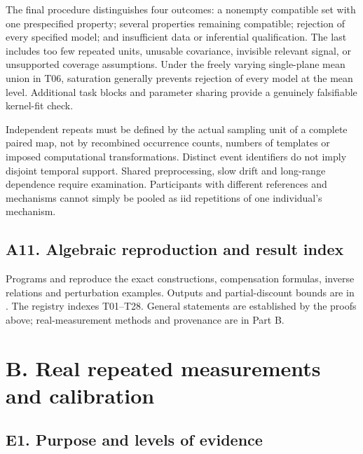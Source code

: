 \documentclass[11pt,a4paper]{article}
\begin{document}
\endgroup

The final procedure distinguishes four outcomes: a nonempty compatible
set with one prespecified property; several properties remaining
compatible; rejection of every specified model; and insufficient data or
inferential qualification. The last includes too few repeated units,
unusable covariance, invisible relevant signal, or unsupported coverage
assumptions. Under the freely varying single-plane mean union in T06,
saturation generally prevents rejection of every model at the mean
level. Additional task blocks and parameter sharing provide a genuinely
falsifiable kernel-fit check.

Independent repeats must be defined by the actual sampling unit of a
complete paired map, not by recombined occurrence counts, numbers of
templates or imposed computational transformations. Distinct event
identifiers do not imply disjoint temporal support. Shared
preprocessing, slow drift and long-range dependence require examination.
Participants with different references and mechanisms cannot simply be
pooled as iid repetitions of one individual's mechanism.

\subsection{A11. Algebraic reproduction and result
index}\label{a11.-algebraic-reproduction-and-result-index}

Programs  and 
reproduce the exact constructions, compensation formulas, inverse
relations and perturbation examples. Outputs and partial-discount bounds
are in . The registry
 indexes T01–T28. General statements
are established by the proofs above; real-measurement methods and
provenance are in Part B.

\clearpage

\section{B. Real repeated measurements and
calibration}\label{b.-real-repeated-measurements-and-calibration}

\subsection{E1. Purpose and levels of
evidence}\label{e1.-purpose-and-levels-of-evidence}
\end{document}
